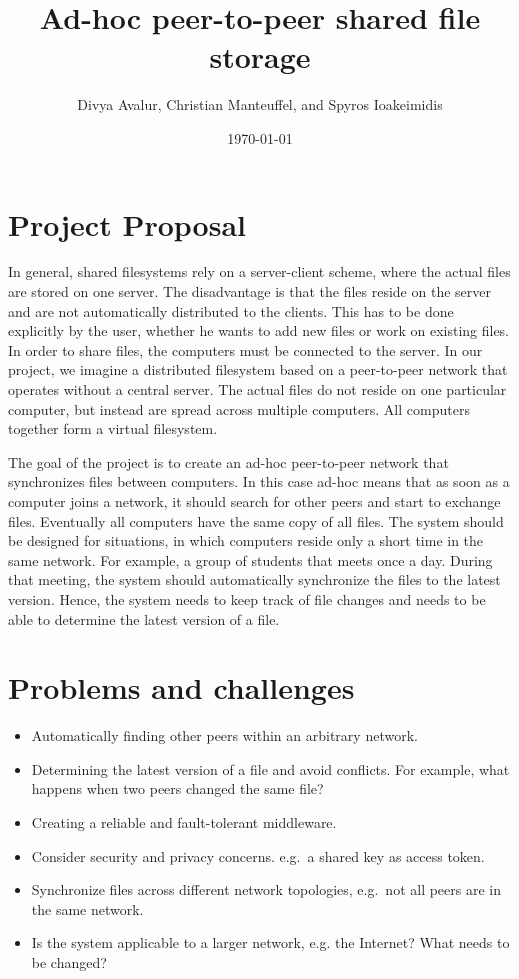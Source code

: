 \documentclass[a4paper, 11pt]{scrartcl}                %
\title{\Large Ad-hoc peer-to-peer shared file storage}
\author{\small Divya Avalur, Christian Manteuffel, and Spyros Ioakeimidis}
\date{\small \today}
\begin{document}
\maketitle

\section{Project Proposal}

In general, shared filesystems rely on a server-client scheme, where the actual files are stored on one server. 
The disadvantage is that the files reside on the server and are not automatically distributed to the clients. This has to be done explicitly by the user, whether he wants to add new files or work on existing files.
In order to share files, the computers must be connected to the server.
In our project, we imagine a distributed filesystem based on a peer-to-peer network that operates without a central server. 
The actual files do not reside on one particular computer, but instead are spread across multiple computers. All computers together form a virtual filesystem.

The goal of the project is to create an ad-hoc peer-to-peer network that synchronizes files between  computers. In this case ad-hoc means that as soon as a computer joins a network, it should search for other peers and start to exchange files. Eventually all computers have the same copy of all files. 
The system should be designed for situations, in which computers reside only a short time in the same network. For example, a group of students that meets once a day. During that meeting, the system should automatically synchronize the files to the latest version. 
Hence, the system needs to keep track of file changes and needs to be able to determine the latest version of a file. 

\section{Problems and challenges}

\begin{itemize}
    \setlength{\itemsep}{0pt} \setlength{\parskip}{0pt}

	\item Automatically finding other peers within an arbitrary network.
	\item Determining the latest version of a file and avoid conflicts.  For example, what happens when two peers changed the same file?
	\item Creating a reliable and fault-tolerant middleware.
	\item Consider security and privacy concerns. e.g.\ a shared key as access token. 
	\item Synchronize files across different network topologies, e.g.\ not all peers are in the same network.
	 \item Is the system applicable to a larger network, e.g.  the Internet? What needs to be changed? 
\end{itemize}
\end{document}
